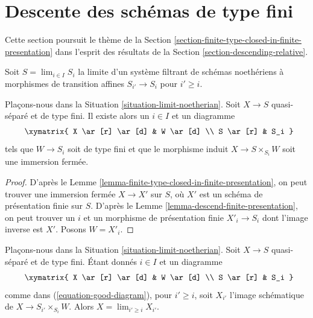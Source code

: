 \section{Descente des schémas de type fini}
\label{section-finite-type-quasi-separated}

\noindent
Cette section poursuit le thème de la
Section \ref{section-finite-type-closed-in-finite-presentation}
dans l'esprit des résultats de la
Section \ref{section-descending-relative}.

\begin{situation}
\label{situation-limit-noetherian}
Soit $S = \lim_{i \in I} S_i$ la limite d'un système filtrant de
schémas noethériens à morphismes de transition affines $S_{i'} \to S_i$
pour $i' \geq i$.
\end{situation}

\begin{lemma}
\label{lemma-good-diagram}
Plaçons-nous dans la Situation \ref{situation-limit-noetherian}.
Soit $X \to S$ quasi-séparé et de type fini.
Il existe alors un $i \in I$ et un diagramme
\begin{equation}
\label{equation-good-diagram}
\vcenter{
\xymatrix{
X \ar[r] \ar[d] & W \ar[d] \\
S \ar[r] & S_i
}
}
\end{equation}
tels que $W \to S_i$ soit de type fini et que
le morphisme induit $X \to S \times_{S_i} W$ soit une immersion
fermée.
\end{lemma}

\begin{proof}
D'après le Lemme \ref{lemma-finite-type-closed-in-finite-presentation},
on peut trouver une immersion fermée $X \to X'$
sur $S$, où $X'$ est un schéma de présentation finie sur $S$.
D'après le Lemme \ref{lemma-descend-finite-presentation},
on peut trouver un $i$ et un morphisme de présentation finie
$X'_i \to S_i$ dont l'image inverse est $X'$. Posons $W = X'_i$.
\end{proof}

\begin{lemma}
\label{lemma-limit-from-good-diagram}
Plaçons-nous dans la Situation \ref{situation-limit-noetherian}.
Soit $X \to S$ quasi-séparé et de type fini.
Étant donnés $i \in I$ et un diagramme
$$
\vcenter{
\xymatrix{
X \ar[r] \ar[d] & W \ar[d] \\
S \ar[r] & S_i
}
}
$$
comme dans (\ref{equation-good-diagram}), pour $i' \geq i$, soit
$X_{i'}$ l'image schématique de $X \to S_{i'} \times_{S_i} W$.
Alors $X = \lim_{i' \geq i} X_{i'}$.
\end{lemma}

